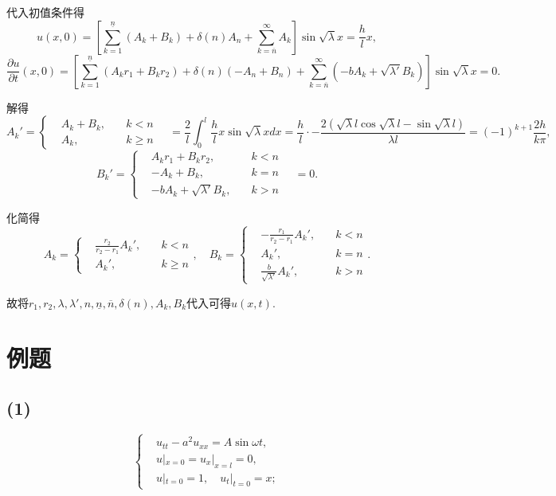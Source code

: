 \documentclass[11pt,a4paper]{article}
\begin{document}
代入初值条件得
$$u(x,0)=\left[\sum_{k=1}^{\underline{n}}(A_k+B_k)+\delta(n)A_n+\sum_{k=\overline{n}}^\infty A_k\right]\sin\sqrt{\lambda}x=\frac{h}{l}x,$$
$$\frac{\partial u}{\partial t}(x,0)=\left[\sum_{k=1}^{\underline{n}}(A_kr_1+B_kr_2)+\delta(n)(-A_n+B_n)+\sum_{k=\overline{n}}^\infty(-bA_k+\sqrt{\lambda'}B_k)\right]\sin\sqrt{\lambda}x=0.$$

解得
$$A_k'=\left\{\begin{aligned}&A_k+B_k,&\quad k<n\\&A_k,&\quad k\geqslant n\end{aligned}\right.
  \quad=\frac{2}{l}\int_0^l\frac{h}{l}x\sin\sqrt{\lambda}xdx=\frac{h}{l}\cdot-\frac{2(\sqrt{\lambda}l\cos\sqrt{\lambda}l-\sin\sqrt{\lambda}l)}{\lambda l}=(-1)^{k+1}\frac{2h}{k\pi},$$
$$B_k'=\left\{\begin{aligned}&A_kr_1+B_kr_2,&\quad k<n\\&-A_k+B_k,&\quad k=n\\&-bA_k+\sqrt{\lambda'}B_k,&\quad k>n\end{aligned}\right.\quad=0.$$

化简得
$$A_k=\left\{\begin{aligned}&\frac{r_2}{r_2-r_1}A_k',&\quad k<n\\&A_k',&\quad k\geqslant n\end{aligned}\right.,\quad
  B_k=\left\{\begin{aligned}&-\frac{r_1}{r_2-r_1}A_k',&\quad k<n\\&A_k',&\quad k=n\\&\frac{b}{\sqrt{\lambda'}}A_k',&\quad k>n\end{aligned}\right..$$

故将$r_1,r_2,\lambda,\lambda',n,\underline{n},\overline{n},\delta(n),A_k,B_k$代入可得$u(x,t)$.

\section*{例题}

\subsection*{(1)}

$$
  \left\{\begin{aligned}
     & u_{tt}-a^2u_{xx}=A\sin\omega t, \\
     & u|_{x=0}=u_x|_{x=l}=0,          \\
     & u|_{t=0}=1,\quad u_t|_{t=0}=x;
  \end{aligned}\right.
$$
\end{document}
